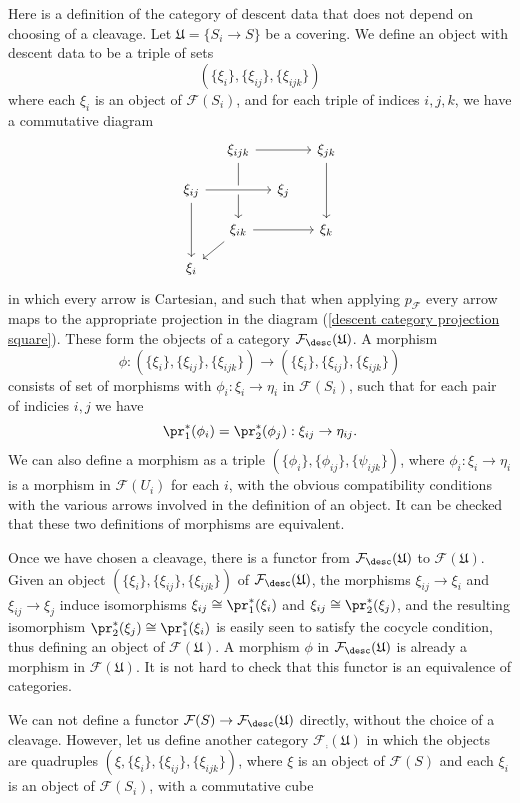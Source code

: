 \begin{remark}
Here is a definition of the category of descent data that does not depend on choosing of a cleavage. Let $\mathfrak{U}=\{S_i\to S\}$ be a covering. We define an object with descent data to be a triple of sets
\[(\{\xi_i\},\{\xi_{ij}\},\{\xi_{ijk}\})\]
where each $\xi_i$ is an object of $\mathcal{F}(S_i)$, and for each triple of indices $i,j,k$, we have a commutative diagram
\[\begin{tikzcd}[row sep=4mm,column sep=4mm]
&\xi_{ijk}\ar[rr]\ar[dd]&&\xi_{jk}\ar[dd]\\
\xi_{ij}\ar[dd]\ar[rr,crossing over]&&\xi_j&\\
&\xi_{ik}\ar[ld]\ar[rr]&&\xi_k\\
\xi_i
\end{tikzcd}\]
in which every arrow is Cartesian, and such that when applying $p_\mathcal{F}$ every arrow maps to the appropriate projection in the diagram (\ref{descent category projection square}). These form the objects of a category $\mathcal{F}_{\desc}(\mathfrak{U})$. A morphism
\[\phi:(\{\xi_i\},\{\xi_{ij}\},\{\xi_{ijk}\})\to (\{\xi_i\},\{\xi_{ij}\},\{\xi_{ijk}\})\]
consists of set of morphisms with $\phi_i:\xi_i\to\eta_i$ in $\mathcal{F}(S_i)$, such that for each pair of indicies $i,j$ we have
\[\pr_1^*(\phi_i)=\pr_2^*(\phi_j):\xi_{ij}\to\eta_{ij}.\]
We can also define a morphism as a triple $(\{\phi_i\},\{\phi_{ij}\},\{\psi_{ijk}\})$, where $\phi_i:\xi_i\to\eta_i$ is a morphism in $\mathcal{F}(U_i)$ for each $i$, with the obvious compatibility conditions with the various arrows involved in the definition of an object. It can be checked that these two definitions of morphisms are equivalent.\par
Once we have chosen a cleavage, there is a functor from $\mathcal{F}_{\desc}(\mathfrak{U})$ to $\mathcal{F}(\mathfrak{U})$. Given an object $(\{\xi_i\},\{\xi_{ij}\},\{\xi_{ijk}\})$ of $\mathcal{F}_{\desc}(\mathfrak{U})$, the morphisms $\xi_{ij}\to\xi_i$ and $\xi_{ij}\to\xi_j$ induce isomorphisms $\xi_{ij}\cong\pr_1^*(\xi_i)$ and $\xi_{ij}\cong\pr_2^*(\xi_j)$, and the resulting isomorphism $\pr_2^*(\xi_j)\cong\pr_1^*(\xi_i)$ is easily seen to satisfy the cocycle condition, thus defining an object of $\mathcal{F}(\mathfrak{U})$. A morphism $\phi$ in $\mathcal{F}_{\desc}(\mathfrak{U})$ is already a morphism in $\mathcal{F}(\mathfrak{U})$. It is not hard to check that this functor is an equivalence of categories.\par
We can not define a functor $\mathcal{F}(S)\to\mathcal{F}_{\desc}(\mathfrak{U})$ directly, without the choice of a cleavage. However, let us define another category $\mathcal{F}_{\comp}(\mathfrak{U})$ in which the objects are quadruples $(\xi,\{\xi_i\},\{\xi_{ij}\},\{\xi_{ijk}\})$, where $\xi$ is an object of $\mathcal{F}(S)$ and each $\xi_i$ is an object of $\mathcal{F}(S_i)$, with a commutative cube

\end{remark}
